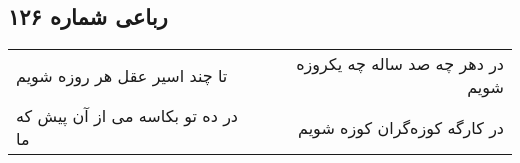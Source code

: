 \begin{center}
\section*{رباعی شماره ۱۲۶}
\label{sec:sh126}
\begin{longtable}{l p{0.5cm} r}
تا چند اسیر عقل هر روزه شویم
&&
در دهر چه صد ساله چه یکروزه شویم
\\
در ده تو بکاسه می از آن پیش که ما
&&
در کارگه کوزه‌گران کوزه شویم
\\
\end{longtable}
\end{center}
